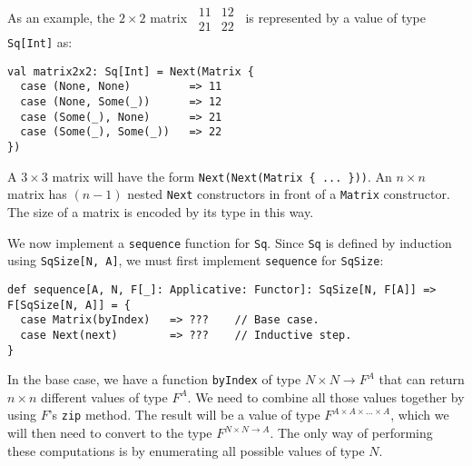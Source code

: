 As an example, the $2\times2$ matrix $\,\begin{array}{|cc|}
11 & 12\\
21 & 22
\end{array}\,$ is represented by a value of type \lstinline!Sq[Int]! as:\vspace{0.2\baselineskip}

\begin{lstlisting}
val matrix2x2: Sq[Int] = Next(Matrix {
  case (None, None)         => 11
  case (None, Some(_))      => 12
  case (Some(_), None)      => 21
  case (Some(_), Some(_))   => 22
})
\end{lstlisting}

A $3\times3$ matrix will have the form \lstinline!Next(Next(Matrix { ... }))!.
An $n\times n$ matrix has $\left(n-1\right)$ nested \lstinline!Next!
constructors in front of a \lstinline!Matrix! constructor. The size
of a matrix is encoded by its type in this way.

We now implement a \lstinline!sequence! function for \lstinline!Sq!.
Since \lstinline!Sq! is defined by induction using \lstinline!SqSize[N, A]!,
we must first implement \lstinline!sequence! for \lstinline!SqSize!:
\begin{lstlisting}
def sequence[A, N, F[_]: Applicative: Functor]: SqSize[N, F[A]] => F[SqSize[N, A]] = {
  case Matrix(byIndex)   => ???    // Base case.
  case Next(next)        => ???    // Inductive step.
}
\end{lstlisting}
In the base case, we have a function \lstinline!byIndex! of type
$N\times N\rightarrow F^{A}$ that can return $n\times n$ different
values of type $F^{A}$. We need to combine all those values together
by using $F$\textsf{'}s \lstinline!zip! method. The result will be a value
of type $F^{A\times A\times...\times A}$, which we will then need
to convert to the type $F^{N\times N\rightarrow A}$. The only way
of performing these computations is by enumerating all possible values
of type $N$.

